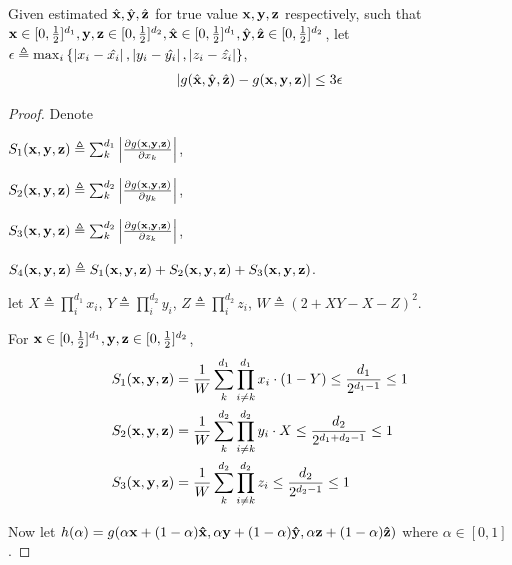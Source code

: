 	\begin{lemma}
		\label{meanvalue2}
		Given estimated $\hat{\bf x},\hat{\bf y},\hat{\bf z}$ for true value $ {\bf x}, {\bf y}, {\bf z}$ respectively, such that ${\bf x} \in [0, \frac{1}{2}]^{d_1} , {\bf y,z} \in [0, \frac{1}{2}]^{d_2}, \hat{\bf x} \in [0, \frac{1}{2}]^{d_1} , \hat{\bf y},\hat{\bf z} \in [0, \frac{1}{2}]^{d_2}$,
		let $\epsilon \triangleq \max_i \left\{\left\vert x_i - \hat{x_i}\right\vert, \left\vert y_i - \hat{y_i} \right\vert , \left\vert z_i - \hat{z_i}\right\vert\right\}$,
		\begin{align*}
		\left\vert g(\hat{\bf x}, \hat{\bf y}, \hat{\bf z}) - g({\bf x,y,z})\right\vert
		\leq  3\epsilon
		\end{align*}

	\end{lemma}

	\begin{proof}
Denote

$S_1({\bf x,y,z}) \triangleq \sum_k^{d_1} \left\vert \frac{\partial g({\bf x,y,z})}{\partial x_k} \right\vert$,

$S_2({\bf x,y,z}) \triangleq \sum_k^{d_2} \left\vert \frac{\partial g({\bf x,y,z})}{\partial y_k} \right\vert$,

$S_3({\bf x,y,z}) \triangleq \sum_k^{d_2} \left\vert \frac{\partial g({\bf x,y,z})}{\partial z_k} \right\vert$,

$S_4({\bf x,y,z}) \triangleq S_1({\bf x,y,z})+S_2({\bf x,y,z})+S_3({\bf x,y,z})$.

let $X \triangleq \prod_i^{d_1} x_i$,
$Y \triangleq \prod_i^{d_2} y_i$,
$Z \triangleq \prod_i^{d_2} z_i$,
$W \triangleq (2+X Y-X-Z)^2$.

For ${\bf x} \in [0, \frac{1}{2}]^{d_1} , {\bf y,z} \in [0, \frac{1}{2}]^{d_2}$,
		\begin{align*}
		S_1({\bf x,y,z}) &= \frac{1}{W} \sum_k^{d_1} \prod_{i\neq k}^{d_1} x_i \cdot \left( 1 - Y \right)
		\leq \frac{d_1}{2^{d_1 - 1}}  \leq 1 \\
		S_2({\bf x,y,z}) &= \frac{1}{W} \sum_k^{d_2} \prod_{i\neq k}^{d_2} y_i \cdot X
		\leq  \frac{d_2}{2^{d_1 + d_2 - 1}} \leq 1 \\
		S_3({\bf x,y,z}) &= \frac{1}{W} \sum_k^{d_2} \prod_{i\neq k}^{d_2} z_i
		\leq \frac{d_2}{2^{d_2 - 1}} \leq 1
		\end{align*}

        Now let $h(\alpha) = g(\alpha {\bf x} + (1 - \alpha) {\bf \hat{x}}, \alpha {\bf y} + (1 - \alpha) {\bf \hat{y}}, \alpha {\bf z} + (1 - \alpha) {\bf \hat{z}})$ where $\alpha \in [0,1]$.


\end{proof}
